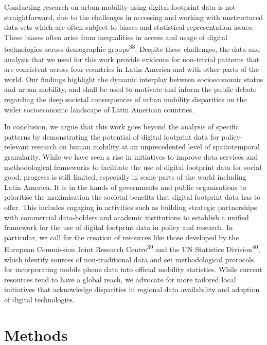 \documentclass[
  11pt,
]{article}
\begin{document}
Conducting research on urban mobility using digital footprint data is
not straightforward, due to the challenges in accessing and working with
unstructured data sets which are often subject to biases and statistical
representation issues. These biases often arise from inequalities in
access and usage of digital technologies across demographic
groups\textsuperscript{38}. Despite these challenges, the data and
analysis that we used for this work provide evidence for non-trivial
patterns that are consistent across four countries in Latin America and
with other parts of the world. Our findings highlight the dynamic
interplay between socioeconomic status and urban mobility, and shall be
used to motivate and inform the public debate regarding the deep
societal consequences of urban mobility disparities on the wider
socioeconomic landscape of Latin American countries.

In conclusion, we argue that this work goes beyond the analysis of
specific patterns by demonstrating the potential of digital footprint
data for policy-relevant research on human mobility at an unprecedented
level of spatiotemporal granularity. While we have seen a rise in
initiatives to improve data services and methodological frameworks to
facilitate the use of digital footprint data for social good, progress
is still limited, especially in some parts of the world including Latin
America. It is in the hands of governments and public organisations to
prioritise the maximisation the societal benefits that digital footprint
data has to offer. This includes engaging in activities such as building
strategic partnerships with commercial data-holders and academic
institutions to establish a unified framework for the use of digital
footprint data in policy and research. In particular, we call for the
creation of resources like those developed by the European Commission
Joint Research Centre\textsuperscript{39} and the UN Statistics
Division\textsuperscript{40}, which identify sources of non-traditional
data and set methodological protocols for incorporating mobile phone
data into official mobility statistics. While current resources tend to
have a global reach, we advocate for more tailored local initiatives
that acknowledge disparities in regional data availability and adoption
of digital technologies.

\hypertarget{sec-methods}{%
\section{Methods}\label{sec-methods}}
\end{document}
